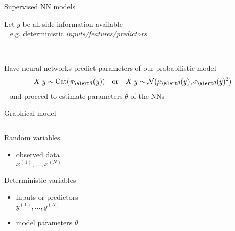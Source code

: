 \begin{frame}{Supervised NN models}

Let $y$ be all side information available\\
~ e.g. deterministic \emph{inputs/features/predictors}

~

Have neural networks predict parameters of our probabilistic model
	\begin{align*}
    X|y \sim \Cat(\pi_{\alert \theta}(y)) & & \text{or} & & X|y \sim \mathcal N(\mu_{\alert \theta}(y), \sigma_{\alert \theta}(y)^2)
    \end{align*}
~ and proceed to \alert{estimate parameters $\theta$}  of the NNs %



\end{frame}



\begin{frame}{Graphical model}

\begin{columns}
\begin{column}{0.6\textwidth}

Random variables
\begin{itemize}
	\item observed data \\
	$x^{(1)}, \ldots, x^{(N)}$
\end{itemize}

Deterministic variables
\begin{itemize}
	\item inputs or predictors \\
	$y^{(1)}, \ldots, y^{(N)}$
	\item model parameters $\theta$
\end{itemize}

\end{column}
\begin{column}{0.2\textwidth}
\end{column}

\end{columns}


\end{frame}


